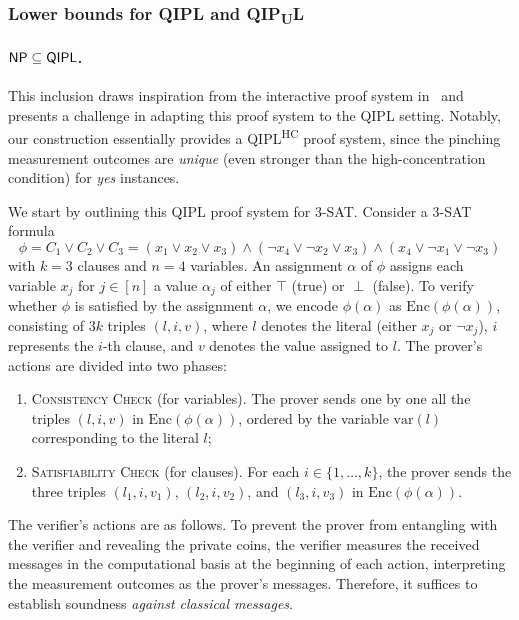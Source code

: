 \documentclass[11pt, a4paper]{article}
\numberwithin{equation}{section}
\numberwithin{figure}{section}
\newcommand{\NP}{\textnormal{\textsf{NP}}\xspace}
\newcommand{\QIPL}{\textnormal{\textsf{QIPL}}\xspace}
\newcommand{\QIPUL}{\texorpdfstring{\textnormal{\textsf{QIP}\textsubscript{\textnormal{U}}\textsf{L}}}\xspace}
\newcommand{\QIPLHC}{\texorpdfstring{\textnormal{\textsf{QIPL}\textsuperscript{\textnormal{HC}}}}\xspace}
\newcommand{\threeSAT}{\textnormal{\textsc{3-SAT}}\xspace}
\newcommand{\var}{\mathrm{var}}
\newcommand{\Enc}{\mathrm{Enc}}
\begin{document}
\subsubsection{Lower bounds for \QIPL{} and \QIPUL{}}

\paragraph{$\NP{} \subseteq \QIPL{}$.}
This inclusion draws inspiration from the interactive proof system in~\cite[Lemma 2]{CL95} and presents a challenge in adapting this proof system to the \QIPL{} setting. 
Notably, our construction essentially provides a \QIPLHC{} proof system, since the pinching measurement outcomes are \textit{unique} (even stronger than the high-concentration condition) for \textit{yes} instances. 

We start by outlining this \QIPL{} proof system for \threeSAT{}. 
Consider a \threeSAT{} formula 
\[\phi = C_1 \vee C_2 \vee C_3 = (x_1 \vee x_2 \vee x_3) \wedge (\neg x_4 \vee \neg x_2 \vee x_3) \wedge (x_4 \vee \neg x_1 \vee \neg x_3)\]
with $k=3$ clauses and $n=4$ variables. An assignment $\alpha$ of $\phi$ assigns each variable $x_j$ for $j \in [n]$ a value $\alpha_j$ of either $\top$ (true) or $\perp$ (false). 
To verify whether $\phi$ is satisfied by the assignment $\alpha$, we encode $\phi(\alpha)$ as $\Enc(\phi(\alpha))$, consisting of $3k$ triples $(l,i,v)$, where $l$ denotes the literal (either $x_j$ or $\neg x_j$), $i$ represents the $i$-th clause, and $v$ denotes the value assigned to $l$. The prover's actions are divided into two phases: 
\begin{enumerate}[label={\upshape(\roman*)}, itemsep=0.33em, topsep=0.33em, parsep=0.33em]
    \item \textsc{Consistency Check} (for variables). The prover sends one by one all the triples $(l,i,v)$ in $\Enc(\phi(\alpha))$, ordered by the variable $\var(l)$ corresponding to the literal $l$; 
    \item \textsc{Satisfiability Check} (for clauses). For each $i\in\{1,\ldots,k\}$, the prover sends the three triples $(l_1,i,v_1)$, $(l_2,i,v_2)$, and $(l_3,i,v_3)$ in $\Enc(\phi(\alpha))$.
\end{enumerate}

The verifier's actions are as follows. 
To prevent the prover from entangling with the verifier and revealing the private coins, the verifier measures the received messages in the computational basis at the beginning of each action, interpreting the measurement outcomes as the prover's messages. Therefore, it suffices to establish soundness \textit{against classical messages}. 
\end{document}
